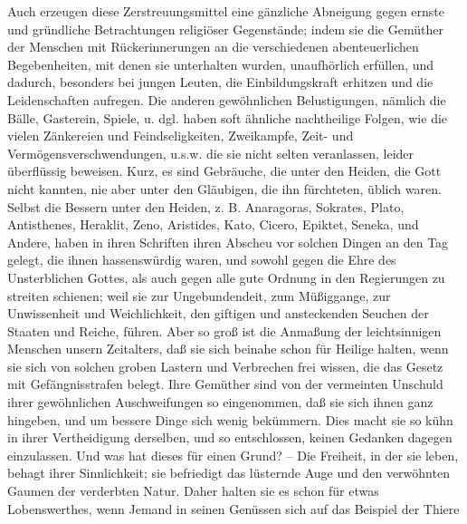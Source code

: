 Auch erzeugen diese Zerstreuungsmittel eine gänzliche Abneigung gegen ernste und
gründliche Betrachtungen religiöser Gegenstände; indem sie die Gemüther der
Menschen mit Rückerinnerungen an die verschiedenen abenteuerlichen
Begebenheiten, mit denen sie unterhalten wurden, unaufhörlich erfüllen, und
dadurch, besonders bei jungen Leuten, die Einbildungskraft erhitzen und die
Leidenschaften aufregen. Die anderen gewöhnlichen Belustigungen, nämlich die
Bälle, Gasterein, Spiele, u. dgl. haben soft ähnliche nachtheilige Folgen, wie
die vielen Zänkereien und Feindseligkeiten, Zweikampfe, Zeit- und
Vermögensverschwendungen, u.s.w. die sie nicht selten veranlassen, leider
überflüssig beweisen. Kurz, es sind Gebräuche, die unter den Heiden, die Gott
nicht kannten, nie aber unter den Gläubigen, die ihn fürchteten, üblich waren.
Selbst die Bessern unter den Heiden, z. B. Anaragoras, Sokrates, Plato,
Antisthenes, Heraklit, Zeno, Aristides, Kato, Cicero, Epiktet, Seneka, und
Andere, haben in ihren Schriften ihren Abscheu vor solchen Dingen an den Tag
gelegt, die ihnen hassenswürdig waren, und sowohl gegen die Ehre des
Unsterblichen Gottes, als auch gegen alle gute Ordnung in den Regierungen zu
streiten schienen; weil sie zur Ungebundendeit, zum Müßiggange, zur Unwissenheit
und Weichlichkeit, den giftigen und ansteckenden Seuchen der Staaten und Reiche,
führen. Aber so groß ist die Anmaßung der leichtsinnigen Menschen unsern
Zeitalters, daß sie sich beinahe schon für Heilige halten, wenn sie sich von
solchen groben Lastern und Verbrechen frei wissen, die das Gesetz mit
Gefängnisstrafen belegt. Ihre Gemüther sind von der vermeinten Unschuld ihrer
gewöhnlichen Auschweifungen so eingenommen, daß sie sich ihnen ganz hingeben,
und um bessere Dinge sich wenig bekümmern. Dies macht sie so kühn in ihrer
Vertheidigung derselben, und so entschlossen, keinen Gedanken dagegen
einzulassen. Und was hat dieses für einen Grund? -- Die Freiheit, in der sie
leben, behagt ihrer Sinnlichkeit; sie befriedigt das lüsternde Auge und den
verwöhnten Gaumen der verderbten Natur. Daher halten sie es schon für etwas
Lobenswerthes, wenn Jemand in seinen Genüssen sich auf das Beispiel der Thiere
